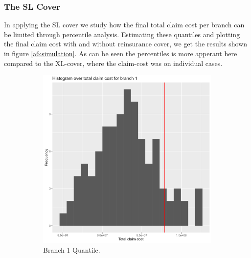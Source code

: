 \documentclass[11pt]{article}
\begin{document}
\subsubsection{The SL Cover}

In applying the SL cover we study how the final total claim cost per branch can be limited through percentile analysis.
Estimating these quantiles and plotting the final claim cost with and without reinsurance cover, we get the results shown in figure \ref{a6:simulation}.
As can be seen the percentiles is more apperant here compared to the XL-cover, where the claim-cost was on individual cases.

 \begin{figure}[!h]
\centering
    \begin{subfigure}{.24\textwidth}
      \centering
      \includegraphics[width=.9\linewidth]{plots/reinsurance2/histogram_over_90p_quantile_1.png}
      \caption{Branch 1 Quantile.}
    \end{subfigure}
    \begin{subfigure}{.24\textwidth}
      \centering

\end{subfigure}
\end{figure}
\end{document}
